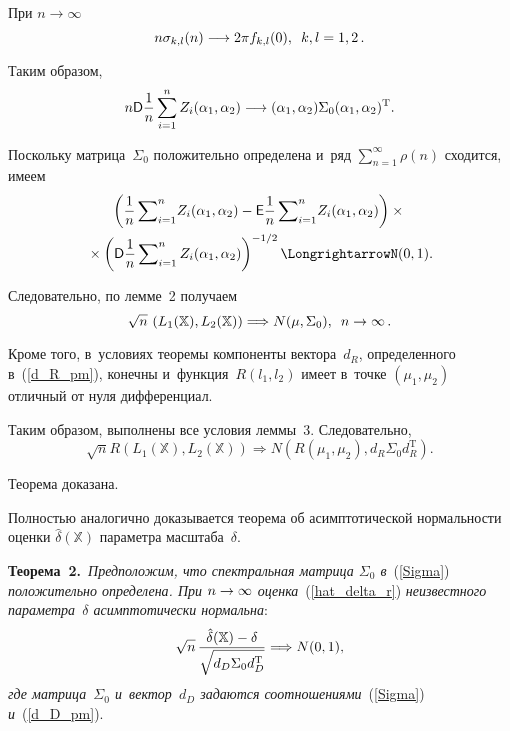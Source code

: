 \begin{multicols}{2}
При $n\to\infty$~\cite{Ibragimov1975}
$$
n\sigma_{k,l}(n)
\longrightarrow
2\pi f_{k,l}(0),\enskip k,l=1,2\,.
$$

Таким образом,
$$
n{\sf D}\displaystyle\frac{\displaystyle 1\mathstrut}{\displaystyle n\mathstrut}\sum\limits_{i=1}^nZ_i(\alpha_1,\alpha_2)\longrightarrow
(\alpha_1,\alpha_2)\Sigma_0(\alpha_1,\alpha_2)^{\mathrm{T}}.
$$

Поскольку матрица~$\Sigma_0$ положительно определена и~ряд 
$\sum\nolimits_{n=1}^\infty\rho(n)$ сходится, имеем~\cite{Ibragimov1975}
\begin{multline*}
\left(\fr{1}{n}\sum\nolimits_{i=1}^n \!Z_i(\alpha_1,\alpha_2)-
\e \fr{1}{n}\sum\nolimits_{i=1}^n \! Z_i(\alpha_1,\alpha_2)\right) \times{}\\
{}\times \left( %
{\D \fr{1}{n}\sum\nolimits_{i=1}^n 
Z_i(\alpha_1,\alpha_2)}\right)^{-1/2}\Longrightarrow%
N(0,1).
\end{multline*}

Следовательно, по лемме~2 получаем
$$
\sqrt{n}\,\left(L_1(\mathbb{X}),L_2(\mathbb{X})\right)\Longrightarrow 
N(\mu,\Sigma_0),\enskip n\to\infty\,.
$$

Кроме того, в~условиях тео\-ре\-мы компоненты вектора~$d_{R}$, определенного в~(\ref{d_R_pm}), 
конечны и~функция~$R(l_1,l_2)$  имеет в~точ\-ке $(\mu_1,\mu_2)$ 
отличный от нуля дифференциал.

Таким образом, выполнены все условия лем\-мы~3. Сле\-до\-ва\-тельно,
$$
\sqrt{n}R(L_1(\mathbb{X}),L_2(\mathbb{X}))\Longrightarrow N\left(R(\mu_1,\mu_2), 
d_{R}\Sigma_0 d_{R}^{\mathrm{T}}\right).
$$

Теорема доказана.

\smallskip

Полностью аналогично доказывается тео\-ре\-ма об асимп\-то\-ти\-че\-ской нор\-маль\-ности оцен\-ки 
${\hat \delta}(\mathbb{X})$ па\-ра\-мет\-ра мас\-шта\-ба~$\delta$.

\smallskip

\noindent
\textbf{Теорема~2.}\
\textit{Предположим, что спект\-раль\-ная мат\-ри\-ца $\Sigma_0$ в}~(\ref{Sigma}) \textit{положительно 
определена. При $n\hm\to\infty$ оценка}~(\ref{hat_delta_r}) \textit{неизвестного па\-ра\-мет\-ра~$\delta$ асимпто\-ти\-чески нор\-мальна}:
$$
\sqrt{n}\,\displaystyle\frac{\displaystyle {\hat \delta}(\mathbb{X})-\delta\mathstrut}{\displaystyle \sqrt{d_{D}\Sigma_0 d_{D}^{\mathrm{T}}}\mathstrut}\Longrightarrow N(0,1),
$$
\textit{где матрица~$\Sigma_0$ и~вектор~$d_D$ задаются соотношениями}~(\ref{Sigma}) \textit{и}~(\ref{d_D_pm}).


\end{multicols}

